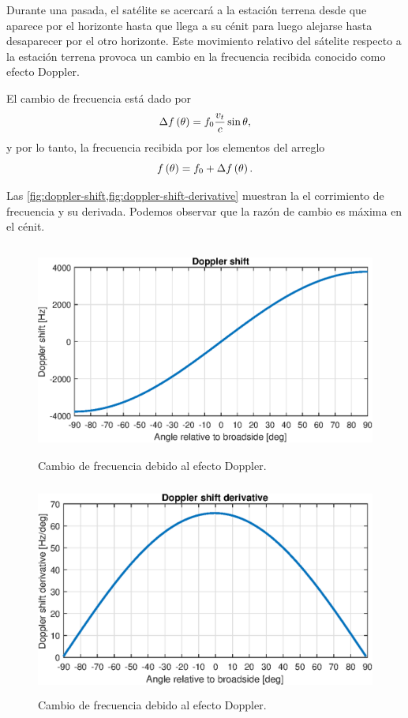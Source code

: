 \documentclass{article}
\newenvironment{standalone}{\begin{preview}}{\end{preview}}
\begin{document}
\begin{standalone}
  Durante una pasada, el satélite se acercará a la estación terrena desde que aparece por el horizonte hasta que llega a su cénit para luego alejarse hasta desaparecer por el otro horizonte. Este movimiento relativo del sátelite respecto a la estación terrena provoca un cambio en la frecuencia recibida conocido como efecto Doppler.

  El cambio de frecuencia está dado por \cite{popescu2016}
  \begin{equation}
    \Delta f \left( \theta \right) = f_0 \frac{v_t}{c} \sin{\theta},
    \tagaddtext{[\si{\hertz}]}
  \end{equation}
  y por lo tanto, la frecuencia recibida por los elementos del arreglo
  \begin{equation}
    f \left( \theta \right) = f_0 + \Delta f \left( \theta \right).
    \tagaddtext{[\si{\hertz}]}
  \end{equation}

  Las \cref{fig:doppler-shift,fig:doppler-shift-derivative} muestran la el corrimiento de frecuencia y su derivada. Podemos observar que la razón de cambio es máxima en el cénit.

  \begin{figure}[!htbp]
    \centering
    \includegraphics[width=\linewidth, height=70mm, keepaspectratio]{../images/doppler-shift.eps}
    \caption{Cambio de frecuencia debido al efecto Doppler.}
    \label{fig:doppler-shift}
  \end{figure}

  \begin{figure}[!htbp]
    \centering
    \includegraphics[width=\linewidth, height=70mm, keepaspectratio]{../images/doppler-shift-derivative.eps}
    \caption{Cambio de frecuencia debido al efecto Doppler.}
    \label{fig:doppler-shift-derivative}
  \end{figure}


\end{standalone}
\end{document}
